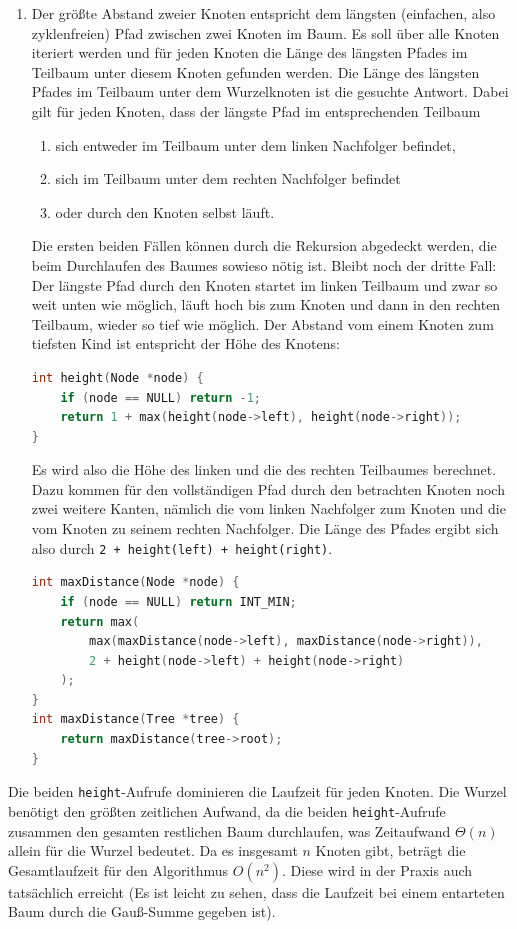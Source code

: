 \documentclass[11pt,a4paper]{article}
\begin{document}
\begin{loesung}
\begin{enumerate}
        \item
        Der größte Abstand zweier Knoten entspricht dem längsten (einfachen, also zyklenfreien) Pfad zwischen zwei Knoten im Baum.
        Es soll über alle Knoten iteriert werden und für jeden Knoten die Länge des längsten Pfades im Teilbaum unter diesem Knoten gefunden werden.
        Die Länge des längsten Pfades im Teilbaum unter dem Wurzelknoten ist die gesuchte Antwort.
        Dabei gilt für jeden Knoten, dass der längste Pfad im entsprechenden Teilbaum
        \begin{enumerate}[label=\arabic*.]
            \item sich entweder im Teilbaum unter dem linken Nachfolger befindet,
            \item sich im Teilbaum unter dem rechten Nachfolger befindet
            \item oder durch den Knoten selbst läuft.
        \end{enumerate}
        Die ersten beiden Fällen können durch die Rekursion abgedeckt werden, die beim Durchlaufen des Baumes sowieso nötig ist.
        Bleibt noch der dritte Fall:
        Der längste Pfad durch den Knoten startet im linken Teilbaum und zwar so weit unten wie möglich, läuft hoch bis zum Knoten und dann in den rechten Teilbaum, wieder so tief wie möglich.
        Der Abstand vom einem Knoten zum \glqq{}tiefsten\grqq{} Kind ist entspricht der Höhe des Knotens:
        \begin{lstlisting}[language=c++]
int height(Node *node) {
    if (node == NULL) return -1;
    return 1 + max(height(node->left), height(node->right));
}
        \end{lstlisting}
        Es wird also die Höhe des linken und die des rechten Teilbaumes berechnet.
        Dazu kommen für den vollständigen Pfad durch den betrachten Knoten noch zwei weitere Kanten, nämlich die vom linken Nachfolger zum Knoten und die vom Knoten zu seinem rechten Nachfolger.
        Die Länge des Pfades ergibt sich also durch \texttt{2 + height(left) + height(right)}.
        \begin{lstlisting}[language=c++]
int maxDistance(Node *node) {
    if (node == NULL) return INT_MIN;
    return max(
        max(maxDistance(node->left), maxDistance(node->right)),
        2 + height(node->left) + height(node->right)
    );
}
int maxDistance(Tree *tree) {
    return maxDistance(tree->root);
}
        \end{lstlisting}
    \end{enumerate}
    Die beiden \texttt{height}-Aufrufe dominieren die Laufzeit für jeden Knoten.
    Die Wurzel benötigt den größten zeitlichen Aufwand, da die beiden \texttt{height}-Aufrufe zusammen den gesamten restlichen Baum durchlaufen, was Zeitaufwand $\Theta(n)$ allein für die Wurzel bedeutet.
    Da es insgesamt $n$ Knoten gibt, beträgt die Gesamtlaufzeit für den Algorithmus $O(n^2)$.
    Diese wird in der Praxis auch tatsächlich erreicht (Es ist leicht zu sehen, dass die Laufzeit bei einem entarteten Baum durch die Gauß-Summe gegeben ist).


\end{loesung}
\end{document}
